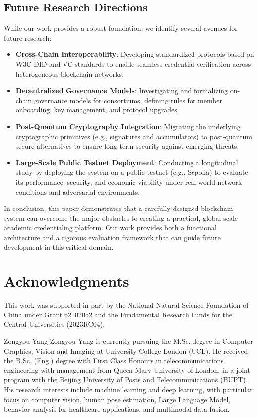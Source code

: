 \documentclass[lettersize,journal]{IEEEtran}
\begin{document}
\begin{itemize}
\subsection{Future Research Directions}
While our work provides a robust foundation, we identify several avenues for future research:
\begin{itemize}
    \item \textbf{Cross-Chain Interoperability}: Developing standardized protocols based on W3C DID and VC standards to enable seamless credential verification across heterogeneous blockchain networks.

    \item \textbf{Decentralized Governance Models}: Investigating and formalizing on-chain governance models for consortiums, defining rules for member onboarding, key management, and protocol upgrades.

    \item \textbf{Post-Quantum Cryptography Integration}: Migrating the underlying cryptographic primitives (e.g., signatures and accumulators) to post-quantum secure alternatives to ensure long-term security against emerging threats.
    
    \item \textbf{Large-Scale Public Testnet Deployment}: Conducting a longitudinal study by deploying the system on a public testnet (e.g., Sepolia) to evaluate its performance, security, and economic viability under real-world network conditions and adversarial environments.
\end{itemize}

In conclusion, this paper demonstrates that a carefully designed blockchain system can overcome the major obstacles to creating a practical, global-scale academic credentialing platform. Our work provides both a functional architecture and a rigorous evaluation framework that can guide future development in this critical domain.

\section*{Acknowledgments}
This work was supported in part by the National Natural Science Foundation of China under Grant 62102052 and the Fundamental Research Funds for the Central Universities (2023RC04).



\begin{IEEEbiographynophoto}{Zongyou Yang}
Zongyou Yang is currently pursuing the M.Sc. degree in Computer Graphics, Vision and Imaging at University College London (UCL). He received the B.Sc. (Eng.) degree with First Class Honours in telecommunications engineering with management from Queen Mary University of London, in a joint program with the Beijing University of Posts and Telecommunications (BUPT). His research interests include machine learning and deep learning, with particular focus on computer vision, human pose estimation, Large Language Model, behavior analysis for healthcare applications, and multimodal data fusion.
\end{IEEEbiographynophoto}


\end{itemize}
\end{document}
